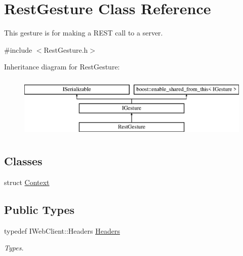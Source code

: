 \hypertarget{class_rest_gesture}{}\section{Rest\+Gesture Class Reference}
\label{class_rest_gesture}


This gesture is for making a R\+E\+ST call to a server.  




{\ttfamily \#include $<$Rest\+Gesture.\+h$>$}

Inheritance diagram for Rest\+Gesture\+:\begin{figure}[H]
\begin{center}
\leavevmode
\includegraphics[height=3.000000cm]{class_rest_gesture}
\end{center}
\end{figure}
\subsection*{Classes}
\begin{DoxyCompactItemize}
\item 
struct \hyperlink{struct_rest_gesture_1_1_context}{Context}
\end{DoxyCompactItemize}
\subsection*{Public Types}
\begin{DoxyCompactItemize}
\item 
\mbox{\label{class_rest_gesture_a4a175cc9d5bccdc4a21aed300daaf3a0}} 
typedef I\+Web\+Client\+::\+Headers \hyperlink{class_rest_gesture_a4a175cc9d5bccdc4a21aed300daaf3a0}{Headers}
\begin{DoxyCompactList}\small\item\em Types. \end{DoxyCompactList}\end{DoxyCompactItemize}
